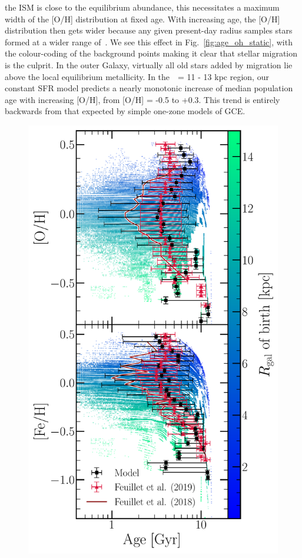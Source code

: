 \documentclass[draft2.tex]{subfiles}
\begin{document}
the ISM is close to the equilibrium abundance, this necessitates a maximum 
width of the [O/H] distribution at fixed age. 
With increasing age, the [O/H] distribution then gets wider because any given 
present-day radius samples stars formed at a wider range of~\rgal. 
We see this effect in Fig.~\ref{fig:age_oh_static}, with the colour-coding of 
the background points making it clear that stellar migration 
is the culprit. 
In the outer Galaxy, virtually all old stars added by migration lie above the 
local equilibrium metallicity. 
In the~\rgal~= 11 - 13 kpc region, our constant SFR model predicts a nearly 
monotonic increase of median population age with increasing [O/H], from 
[O/H] = -0.5 to +0.3. 
This trend is entirely backwards from that expected by simple one-zone models 
of GCE. 

\begin{figure} 
\centering 
\includegraphics[scale = 0.45]{amr_solar_annulus.pdf} 

\end{figure}
\end{document}
